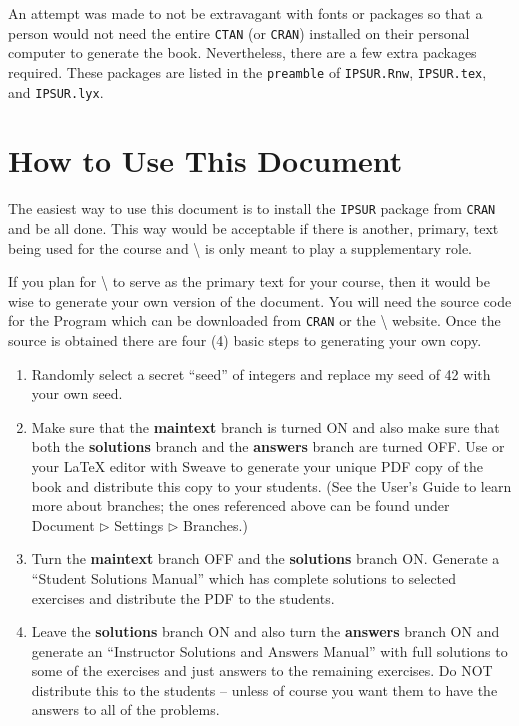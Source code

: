 \documentclass[captions=tableheading]{scrbook}
\begin{document}
An attempt was made to not be extravagant with fonts or packages so that a person would not need the entire \texttt{CTAN} (or \texttt{CRAN}) installed on their personal computer to generate the book. Nevertheless, there are a few extra packages required. These packages are listed in the \texttt{preamble} of \texttt{IPSUR.Rnw}, \texttt{IPSUR.tex}, and \texttt{IPSUR.lyx}.
\section{How to Use This Document \label{sec:How-to-Use-Document}}
\label{sec-23-2}


The easiest way to use this document is to install the \texttt{IPSUR} package from \texttt{CRAN} and be all done. This way would be acceptable if there is another, primary, text being used for the course and \IPSUR\textbackslash{} is only meant to play a supplementary role.

If you plan for \IPSUR\textbackslash{} to serve as the primary text for your course, then it would be wise to generate your own version of the document. You will need the source code for the Program which can be downloaded from \texttt{CRAN} or the \IPSUR\textbackslash{} website. Once the source is obtained there are four (4) basic steps to generating your own copy.

\begin{enumerate}
\item Randomly select a secret ``seed'' of integers and replace my seed of 42 with your own seed.
\item Make sure that the \textsf{\textbf{maintext}} branch is turned \textsf{ON} and also make sure that both the \textsf{\textbf{solutions}} branch and the \textsf{\textbf{answers}} branch are turned \textsf{OFF}. Use \LyX{} or your \LaTeX{} editor with Sweave to generate your unique PDF copy of the book and distribute this copy to your students. (See the \LyX{} User's Guide to learn more about branches; the ones referenced above can be found under \textsf{Document \(\triangleright\) Settings \(\triangleright\) Branches}.)
\item Turn the \textsf{\textbf{maintext}} branch \textsf{OFF} and the \textsf{\textbf{solutions}} branch \textsf{ON}. Generate a ``Student Solutions Manual'' which has complete solutions to selected exercises and distribute the PDF to the students.
\item Leave the \textsf{\textbf{solutions}} branch \textsf{ON} and also turn the \textsf{\textbf{answers}} branch \textsf{ON} and generate an ``Instructor Solutions and Answers Manual'' with full solutions to some of the exercises and just answers to the remaining exercises. Do NOT distribute this to the students -- unless of course you want them to have the answers to all of the problems.
\end{enumerate}
\end{document}
